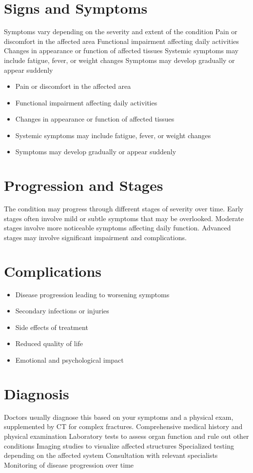 \section{Signs and Symptoms}
Symptoms vary depending on the severity and extent of the condition Pain or discomfort in the affected area Functional impairment affecting daily activities Changes in appearance or function of affected tissues Systemic symptoms may include fatigue, fever, or weight changes Symptoms may develop gradually or appear suddenly

\begin{itemize}[noitemsep]
  \item Pain or discomfort in the affected area
  \item Functional impairment affecting daily activities
  \item Changes in appearance or function of affected tissues
  \item Systemic symptoms may include fatigue, fever, or weight changes
  \item Symptoms may develop gradually or appear suddenly
\end{itemize}
\section{Progression and Stages}
The condition may progress through different stages of severity over time. Early stages often involve mild or subtle symptoms that may be overlooked. Moderate stages involve more noticeable symptoms affecting daily function. Advanced stages may involve significant impairment and complications.
\section{Complications}
\begin{itemize}[noitemsep]
  \item Disease progression leading to worsening symptoms
  \item Secondary infections or injuries
  \item Side effects of treatment
  \item Reduced quality of life
  \item Emotional and psychological impact
\end{itemize}
\section{Diagnosis}
Doctors usually diagnose this based on your symptoms and a physical exam, supplemented by CT for complex fractures. Comprehensive medical history and physical examination Laboratory tests to assess organ function and rule out other conditions Imaging studies to visualize affected structures Specialized testing depending on the affected system Consultation with relevant specialists Monitoring of disease progression over time

